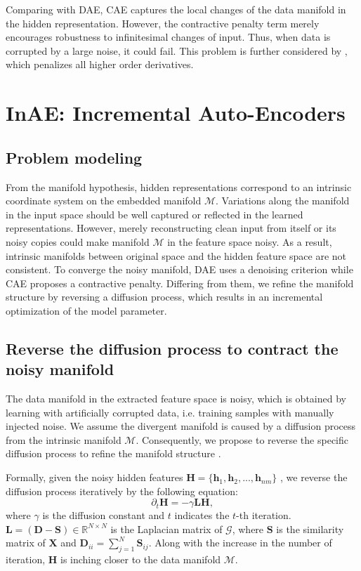 \documentclass{article}
\def \h{\mathbf h}
\def \D{\mathbf D}
\def \HH{\mathbf H}
\def \LL{\mathbf L}
\def \SSS{\mathbf S}
\def \X{\mathbf X}
\def \MM{{\mathcal M}}
\def \GM{{\mathcal G}}
\begin{document}
Comparing with DAE, CAE captures the local changes of the data manifold in the hidden representation. However, the contractive penalty term merely encourages robustness to infinitesimal changes of input. Thus, when data is corrupted by a large noise, it could fail. This problem is further considered by \cite{rifai2011higher}, which penalizes all higher order derivatives.

\section{InAE: Incremental Auto-Encoders}
\subsection{Problem modeling}
From the manifold hypothesis, hidden representations correspond to an intrinsic coordinate system on the embedded manifold $\MM$.  Variations along the manifold in the input space should be well captured or reflected in the learned representations. However, merely reconstructing clean input from itself or its noisy copies could make manifold $\MM$ in the feature space noisy. As a result, intrinsic manifolds between original space and the hidden feature space are not consistent.
To converge the noisy manifold, DAE uses a denoising criterion while CAE proposes a contractive penalty. Differing from them, we refine the manifold structure by reversing a diffusion process, which results in an incremental optimization of the model parameter.

\subsection{Reverse the diffusion process to contract the noisy manifold}
The data manifold in the extracted feature space is noisy, which is obtained by learning with artificially corrupted data, i.e. training samples with manually injected noise. We assume the divergent manifold is caused by  a diffusion process from the intrinsic manifold $\MM$.  Consequently, we propose to reverse the specific diffusion process to refine the manifold structure .

Formally, given the noisy hidden features $\HH = \{\h_1, \h_2, ..., \h_{nm}\}$ , we reverse the diffusion process iteratively by the following equation:
\begin{equation}
  \partial_t \HH = -\gamma \LL \HH,
  \label{eq:MD}
\end{equation}
where $\gamma$ is the diffusion constant and $t$ indicates the $t$-th iteration. $\LL = (\D - \SSS)\in \mathbb{R}^{N \times N}$ is the Laplacian matrix of $\GM$, where $\SSS$ is the similarity matrix of $\X$ and $\D_{ii} = \sum_{j=1}^N \SSS_{ij}$. Along with the increase in the number of iteration, $\HH$ is inching closer to the data manifold $\MM$.
\end{document}
